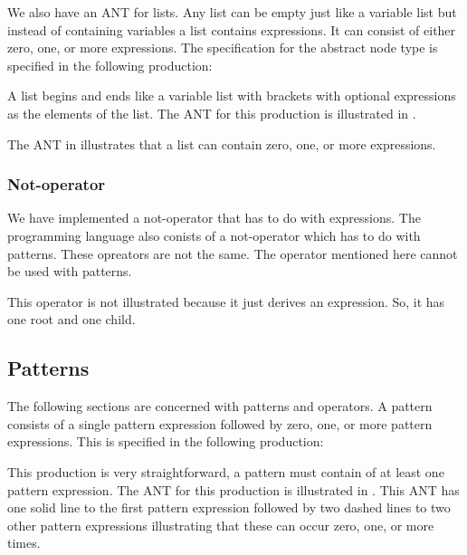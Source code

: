 We also have an ANT for lists. Any list can be empty
just like a variable list but instead of containing variables a list contains
expressions. It can consist of either zero, one, or more expressions. The
specification for the abstract node type is specified in the following
production:

\begin{ebnf}
\end{ebnf}

A list begins and ends like a variable list with brackets with optional
expressions as the elements of the list. The ANT for this production is illustrated
in .



The ANT in  illustrates that a list can contain zero, one, or
more expressions.

\subsubsection{Not-operator}

We have implemented a not-operator that has to do with expressions. The programming
language also conists of a not-operator which has to do with patterns. These
opreators are not the same. The operator mentioned here cannot be used with
patterns. 

This operator is not illustrated because it just derives an expression. So, it 
has one root and one child.

\subsection{Patterns}

The following sections are concerned with patterns and operators. A pattern
consists of a single pattern expression followed by zero, one, or more pattern
expressions.  This is specified in the following production:

\begin{ebnf}
\end{ebnf}

This production is very straightforward, a pattern must contain of at least one
pattern expression. The ANT for this production is illustrated in
. This ANT has one solid line to the first pattern
expression followed by two dashed lines to two other pattern expressions
illustrating that these can occur zero, one, or more times.

